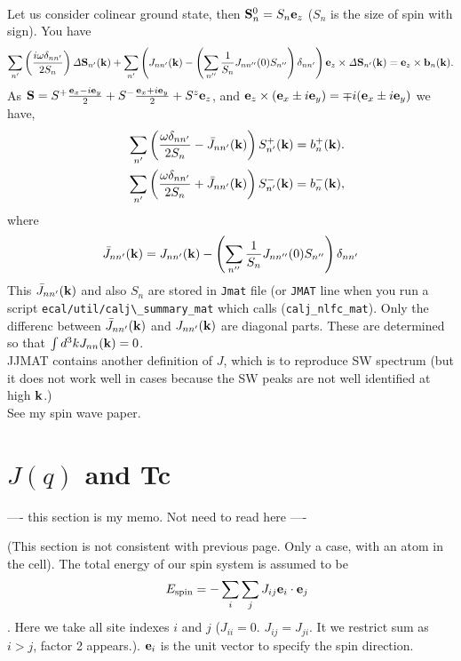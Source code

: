\documentclass[a4paper,10pt,epsf,fleqn]{article}
\newcommand{\bfe}{{\bf e}}
\newcommand{\bfk}{{\bf k}}
\newcommand{\bfex}{{\bf e}_x}
\newcommand{\bfey}{{\bf e}_y}
\newcommand{\bfez}{{\bf e}_z}
\newcommand{\bfb}{{\bf b}}
\newcommand{\bfS}{{\bf S}}
\newcommand{\bfiS}{{\it \Delta \bf S}}
\begin{document}
{{{\begin{eqnarray}
\label{hei5}
\end{eqnarray}
Let us consider colinear ground state, then $\bfS^0_{n}= S_n \bfe_z$
($S_n$ is the size of spin with sign). You have
\begin{eqnarray}
\sum_{n'} \left( \frac{i \omega \delta_{nn'}}{2S_n} \right) \bfiS_{n'}(\bfk)
+\sum_{n'} \left( J_{n n'}(\bfk) 
- \left( \sum_{n''} \frac{1}{S_n} J_{n n''}(0) S_{n''} \right) \delta_{nn'}\right)  \bfez \times \bfiS_{n'}(\bfk)
=  \bfez \times \bfb_{n}(\bfk).
\label{hei6}
\end{eqnarray}
As $\bfS = S^+ \frac{\bfex -i \bfey}{2}
         + S^- \frac{\bfex +i \bfey}{2} + S^z \bfez$,
and $\bfez \times ({\bfex \pm i \bfey}) = \mp i({\bfex \pm i \bfey})$
we have,
\begin{eqnarray}
&&\sum_{n'} \left( \frac{\omega \delta_{nn'}} {2S_n} -
 \bar{J}_{n n'}(\bfk) \right)  S^+_{n'}(\bfk)
=  b^+_{n}(\bfk). \\
&&\sum_{n'} \left( \frac{\omega \delta_{nn'}} {2S_n} + 
\bar{J}_{nn'}(\bfk)  \right)    S^-_{n'}(\bfk)
=  b^-_{n}(\bfk),
\end{eqnarray}
where
\begin{eqnarray}
\bar{J}_{nn'}(\bfk)=  J_{n n'}(\bfk) 
- \left( \sum_{n''} \frac{1}{S_n} J_{n n''}(0) S_{n''} \right) \delta_{nn'}
\label{jbar}
\end{eqnarray}
This $\bar{J}_{nn'}(\bfk)$ and also $S_n $ are stored in \verb#Jmat# file
(or \verb#JMAT# line when you run a script \verb#ecal/util/calj\_summary_mat# 
which calls (\verb#calj_nlfc_mat#). 
Only the differenc between $\bar{J}_{nn'}(\bfk)$ and $J_{n n'}(\bfk)$
are diagonal parts. 
These are determined so that $\int d^3k {J}_{nn}(\bfk)=0$.\\

\noindent JJMAT contains another definition of $J$, which is to reproduce SW spectrum
(but it does not work well in cases because the SW peaks are not well identified at high $\bfk$.)\\

See my spin wave paper.


\section{$J(q)$ and Tc}
---- this section is my memo. Not need to read here ----

(This section is not consistent with previous page. Only a case, with an atom in the cell).
The total energy of our spin system is assumed to be
\begin{eqnarray}
&& E_{\rm spin} = - \sum_i \sum_j J_{ij} \bfe_i \cdot \bfe_j
\label{heis1}
\end{eqnarray}
. Here we take all site indexes $i$ and $j$ 
($J_{ii}=0$. $J_{ij}=J_{ji}$. 
It we restrict sum as $i>j$, factor 2 appears.).
$\bfe_i$ is the unit vector to specify the spin direction.

}}}
\end{document}
